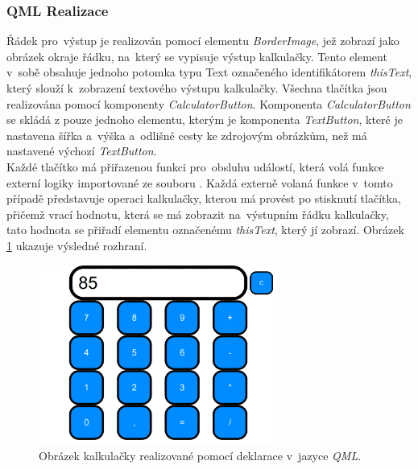 \documentclass[11pt,twoside,a4paper]{book}
\begin{document}
\subsubsection{QML Realizace}
Řádek pro~výstup je realizován pomocí elementu \textit{BorderImage}, jež zobrazí jako obrázek okraje řádku, na~který se vypisuje výstup kalkulačky. Tento element v~sobě obsahuje jednoho potomka typu Text označeného identifikátorem \textit{thisText}, který slouží k~zobrazení textového výstupu kalkulačky.
Všechna tlačítka jsou realizována pomocí komponenty \textit{CalculatorButton}.  Komponenta \textit{CalculatorButton} se skládá z pouze jednoho elementu, kterým je komponenta \textit{TextButton}, které je nastavena šířka a~výška a~odlišné cesty ke zdrojovým obrázkům, než má nastavené výchozí \textit{TextButton}.\\ Každé tlačítko má přiřazenou funkci pro~obsluhu událostí, která volá funkce externí logiky importované ze souboru . Každá externě volaná funkce v~tomto případě představuje operaci kalkulačky, kterou má provést po stisknutí tlačítka, přičemž vrací hodnotu, která se má zobrazit na~výstupním řádku kalkulačky, tato hodnota se přiřadí elementu označenému \textit{thisText}, který jí zobrazí. Obrázek \ref{fig:outCalcQML} ukazuje výsledné rozhraní.
\begin{figure}[!ht]
\begin{center}
  \includegraphics[width=0.7\textwidth]{figures/qmlCalc}
\caption{{\label{fig:outCalcQML}}Obrázek kalkulačky realizované pomocí deklarace v~jazyce \textit{QML}.}
\end{center}
\end{figure}
\end{document}
